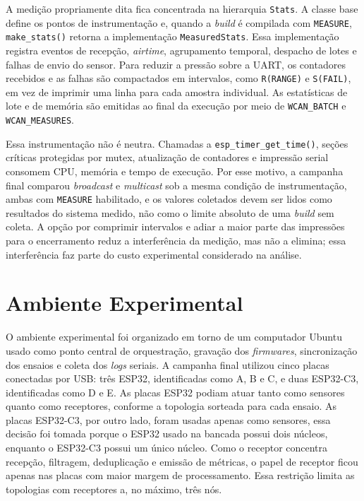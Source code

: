 A medição propriamente dita fica concentrada na hierarquia \texttt{Stats}. A classe base define os pontos de instrumentação e, quando a \emph{build} é compilada com \texttt{MEASURE}, \texttt{make\_stats()} retorna a implementação \texttt{MeasuredStats}. Essa implementação registra eventos de recepção, \emph{airtime}, agrupamento temporal, despacho de lotes e falhas de envio do sensor. Para reduzir a pressão sobre a UART, os contadores recebidos e as falhas são compactados em intervalos, como \texttt{R(RANGE)} e \texttt{S(FAIL)}, em vez de imprimir uma linha para cada amostra individual. As estatísticas de lote e de memória são emitidas ao final da execução por meio de \texttt{WCAN\_BATCH} e \texttt{WCAN\_MEASURES}.

Essa instrumentação não é neutra. Chamadas a \texttt{esp\_timer\_get\_time()}, seções críticas protegidas por mutex, atualização de contadores e impressão serial consomem CPU, memória e tempo de execução. Por esse motivo, a campanha final comparou \emph{broadcast} e \emph{multicast} sob a mesma condição de instrumentação, ambas com \texttt{MEASURE} habilitado, e os valores coletados devem ser lidos como resultados do sistema medido, não como o limite absoluto de uma \emph{build} sem coleta. A opção por comprimir intervalos e adiar a maior parte das impressões para o encerramento reduz a interferência da medição, mas não a elimina; essa interferência faz parte do custo experimental considerado na análise.

\section{Ambiente Experimental}

O ambiente experimental foi organizado em torno de um computador Ubuntu usado como ponto central de orquestração, gravação dos \emph{firmwares}, sincronização dos ensaios e coleta dos \emph{logs} seriais. A campanha final utilizou cinco placas conectadas por USB: três ESP32, identificadas como A, B e C, e duas ESP32-C3, identificadas como D e E. As placas ESP32 podiam atuar tanto como sensores quanto como receptores, conforme a topologia sorteada para cada ensaio. As placas ESP32-C3, por outro lado, foram usadas apenas como sensores, essa decisão foi tomada porque o ESP32 usado na bancada possui dois núcleos, enquanto o ESP32-C3 possui um único núcleo. Como o receptor concentra recepção, filtragem, deduplicação e emissão de métricas, o papel de receptor ficou apenas nas placas com maior margem de processamento. Essa restrição limita as topologias com receptores a, no máximo, três nós.

